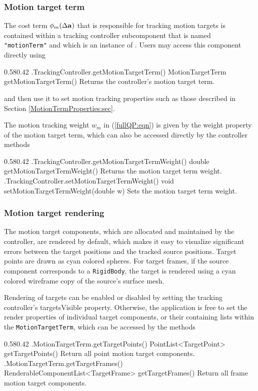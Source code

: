 \subsubsection{Motion target term}
\label{MotionTargetTerm:sec}

The cost term $\phi_m(\Delta {\bf a})$ that is 
responsible for tracking motion targets is
contained within a tracking controller subcomponent that is named {\tt
"motionTerm"} and which is an instance of
. Users 
may access this component directly using
%
\begin{methodtable}{0.58}{0.42}
\midline
%
\methodentry
{\inverse.TrackingController.getMotionTargetTerm()}%
{MotionTargetTerm getMotionTargetTerm()}%
{Returns the controller's motion target term.}%
%
\midline
\end{methodtable}
%
and then use it to set motion tracking properties such as those described in
Section \ref{MotionTermProperties:sec}.

The motion tracking weight $w_m$ in (\ref{fullQP:eqn}) is
given by the {\sf weight} property of the motion target term,
which can also be accessed directly by the controller methods
%
\begin{methodtable}{0.58}{0.42}
\midline
%
\methodentry
{\inverse.TrackingController.getMotionTargetTermWeight()}%
{double getMotionTargetTermWeight()}%
{Returns the motion target term weight.}%
%
\methodentry
{\inverse.TrackingController.setMotionTargetTermWeight()}%
{void setMotionTargetTermWeight(double w)}%
{Sets the motion target term weight.}%
%
\midline
\end{methodtable}
%

\subsubsection{Motion target rendering}
\label{MotionTargetRendering:sec}

The motion target components, which are allocated and maintained by the
controller, are rendered by default, which makes it easy to visualize
significant errors between the target positions and the tracked source
positions. Target points are drawn as cyan colored spheres.  For target frames,
if the source component corresponds to a {\tt RigidBody}, the target is
rendered using a cyan colored wireframe copy of the source's surface mesh.

Rendering of targets can be enabled or disabled by setting the tracking
controller's {\sf targetsVisible} property. Otherwise, the application is free
to set the render properties of individual target components, or their
containing lists within the {\tt MotionTargetTerm}, which can
be accessed by the methods
%
\begin{methodtable}{0.58}{0.42}
\midline
%
\methodentry
{\inverse.MotionTargetTerm.getTargetPoints()}%
{PointList<TargetPoint> getTargetPoints()}%
{Return all point motion target components.}%
%
\methodentry
{\inverse.MotionTargetTerm.getTargetFrames()}%
{RenderableComponentList<TargetFrame> getTargetFrames()}%
{Return all frame motion target components.}%
%
\midline
\end{methodtable}
%

